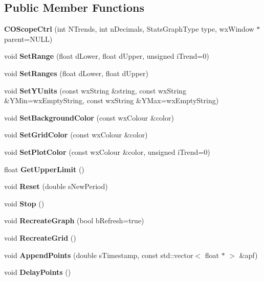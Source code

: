\subsection*{Public Member Functions}
\begin{DoxyCompactItemize}
\item 
{\bfseries COScopeCtrl} (int NTrends, int nDecimals, StatsGraphType type, wxWindow $\ast$parent=NULL)\label{classCOScopeCtrl_a75569490592adc84eca45fabebe81077}

\item 
void {\bfseries SetRange} (float dLower, float dUpper, unsigned iTrend=0)\label{classCOScopeCtrl_a87b9645e02b3633ac080836cc4fd10e6}

\item 
void {\bfseries SetRanges} (float dLower, float dUpper)\label{classCOScopeCtrl_ac261cb5e789d0ffb1f330ac88b6e79f4}

\item 
void {\bfseries SetYUnits} (const wxString \&string, const wxString \&YMin=wxEmptyString, const wxString \&YMax=wxEmptyString)\label{classCOScopeCtrl_afa79e26f0ec5e5babe0f615a461f9568}

\item 
void {\bfseries SetBackgroundColor} (const wxColour \&color)\label{classCOScopeCtrl_a8c4b1ed7ec61da80d91654cd9e8584fa}

\item 
void {\bfseries SetGridColor} (const wxColour \&color)\label{classCOScopeCtrl_a658f9d06f35b0b224fb507a48a3541c6}

\item 
void {\bfseries SetPlotColor} (const wxColour \&color, unsigned iTrend=0)\label{classCOScopeCtrl_a238ec9ee7ac191a2af062a72f6fc0809}

\item 
float {\bfseries GetUpperLimit} ()\label{classCOScopeCtrl_ae6bb41c1878ebbda7096b7e5a70733b2}

\item 
void {\bfseries Reset} (double sNewPeriod)\label{classCOScopeCtrl_a7363dddcc77c3a1e26a0c57b31e4ee04}

\item 
void {\bfseries Stop} ()\label{classCOScopeCtrl_a6a665e66546ef236f46d0ed3149b100a}

\item 
void {\bfseries RecreateGraph} (bool bRefresh=true)\label{classCOScopeCtrl_a168b365685764dc6984b2605a6eb47a0}

\item 
void {\bfseries RecreateGrid} ()\label{classCOScopeCtrl_abb67ed728576dfa3fb2fd55cc3a57497}

\item 
void {\bfseries AppendPoints} (double sTimestamp, const std::vector$<$ float $\ast$ $>$ \&apf)\label{classCOScopeCtrl_a73684d9a1c5509c87f7a12e5da544588}

\item 
void {\bfseries DelayPoints} ()\label{classCOScopeCtrl_aca9cada20f3cb050c4a6fc22844478d8}

\end{DoxyCompactItemize}
